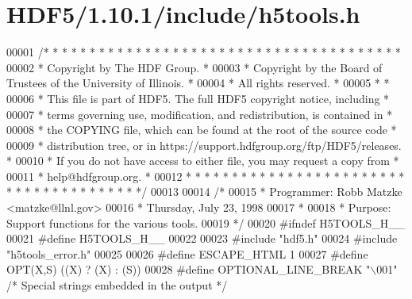 \hypertarget{_h_d_f5_21_810_81_2include_2h5tools_8h_source}{}\section{H\+D\+F5/1.10.1/include/h5tools.h}
\label{_h_d_f5_21_810_81_2include_2h5tools_8h_source}

\begin{DoxyCode}
00001 \textcolor{comment}{/* * * * * * * * * * * * * * * * * * * * * * * * * * * * * * * * * * * * * * *}
00002 \textcolor{comment}{ * Copyright by The HDF Group.                                               *}
00003 \textcolor{comment}{ * Copyright by the Board of Trustees of the University of Illinois.         *}
00004 \textcolor{comment}{ * All rights reserved.                                                      *}
00005 \textcolor{comment}{ *                                                                           *}
00006 \textcolor{comment}{ * This file is part of HDF5.  The full HDF5 copyright notice, including     *}
00007 \textcolor{comment}{ * terms governing use, modification, and redistribution, is contained in    *}
00008 \textcolor{comment}{ * the COPYING file, which can be found at the root of the source code       *}
00009 \textcolor{comment}{ * distribution tree, or in https://support.hdfgroup.org/ftp/HDF5/releases.  *}
00010 \textcolor{comment}{ * If you do not have access to either file, you may request a copy from     *}
00011 \textcolor{comment}{ * help@hdfgroup.org.                                                        *}
00012 \textcolor{comment}{ * * * * * * * * * * * * * * * * * * * * * * * * * * * * * * * * * * * * * * */}
00013 
00014 \textcolor{comment}{/*}
00015 \textcolor{comment}{ * Programmer:  Robb Matzke <matzke@llnl.gov>}
00016 \textcolor{comment}{ *              Thursday, July 23, 1998}
00017 \textcolor{comment}{ *}
00018 \textcolor{comment}{ * Purpose:     Support functions for the various tools.}
00019 \textcolor{comment}{ */}
00020 \textcolor{preprocessor}{#ifndef H5TOOLS\_H\_\_}
00021 \textcolor{preprocessor}{#define H5TOOLS\_H\_\_}
00022 
00023 \textcolor{preprocessor}{#include "hdf5.h"}
00024 \textcolor{preprocessor}{#include "h5tools\_error.h"}
00025 
00026 \textcolor{preprocessor}{#define ESCAPE\_HTML             1}
00027 \textcolor{preprocessor}{#define OPT(X,S)                ((X) ? (X) : (S))}
00028 \textcolor{preprocessor}{#define OPTIONAL\_LINE\_BREAK     "\(\backslash\)001"  }\textcolor{comment}{/* Special strings embedded in the output */}\textcolor{preprocessor}{}

\end{DoxyCode}
